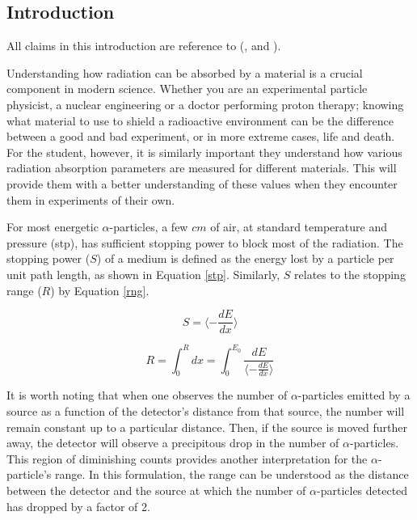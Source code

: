 \documentclass[10pt]{article}
\begin{document}
\begin{multicols}{2}

\section{Introduction}
All claims in this introduction are reference to (\cite{bib:1}, \cite{bib:2} and \cite{bib:3}). \par

Understanding how radiation can be absorbed by a material is a crucial component in modern science. Whether you are an experimental particle physicist, a nuclear engineering or a doctor performing proton therapy; knowing what material to use to shield a radioactive environment can be the difference between a good and bad experiment, or in more extreme cases, life and death. For the student, however, it is similarly important they understand how various radiation absorption parameters are measured for different materials.  This will provide them with a better understanding of these values when they encounter them in experiments of their own.  \par 

For most energetic $\alpha$-particles, a few $cm$ of air, at standard temperature and pressure (stp), has sufficient stopping power to block most of the radiation.  The stopping power ($S$) of a medium is defined as the energy lost by a particle per unit path length, as shown in Equation \ref{stp}.  Similarly, $S$ relates to the stopping range ($R$) by Equation \ref{rng}.

\begin{equation}
	S = \langle - \frac{dE}{dx} \rangle \label{stp}
\end{equation}

\begin{equation}
	R = \int_{0}^{R} dx = \int_{0}^{E_{0}} \frac{dE}{ \langle -\frac{dE}{dx} \rangle}
	\label{rng}
\end{equation}

It is worth noting that when one observes the number of $\alpha$-particles emitted by a source as a function of the detector's distance from that source, the number will remain constant up to a particular distance.  Then, if the source is moved further away, the detector will observe a precipitous drop in the number of $\alpha$-particles.  This region of diminishing counts provides another interpretation for the $\alpha$-particle's range.  In this formulation, the range can be understood as the distance between the detector and the source at which the number of $\alpha$-particles detected has dropped by a factor of 2. \par 


\end{multicols}
\end{document}
